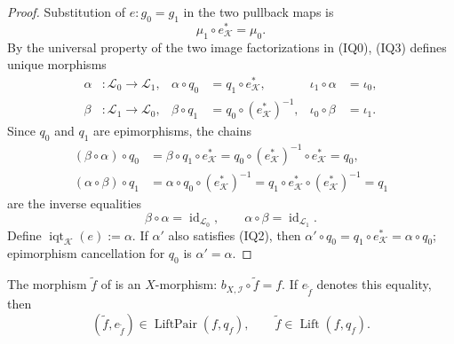 \begin{proof}
  Substitution of $e\colon g_0=g_1$ in the two pullback maps is
  \[
    \mu_1\circ e_{\mathcal K}^*=\mu_0.                        \tag{IQ3}
  \]
  By the universal property of the two image factorizations in (IQ0), (IQ3)
  defines unique morphisms
  \[
  \begin{aligned}
    \alpha&\colon\mathcal L_0\to\mathcal L_1,
      &\alpha\circ q_0&=q_1\circ e_{\mathcal K}^*,
      &\iota_1\circ\alpha&=\iota_0,\\
    \beta&\colon\mathcal L_1\to\mathcal L_0,
      &\beta\circ q_1&=q_0\circ(e_{\mathcal K}^*)^{-1},
      &\iota_0\circ\beta&=\iota_1.
  \end{aligned}                                                  \tag{IQ4}
  \]
  Since $q_0$ and $q_1$ are epimorphisms, the chains
  \[
  \begin{aligned}
    (\beta\circ\alpha)\circ q_0
      &=\beta\circ q_1\circ e_{\mathcal K}^*
       =q_0\circ(e_{\mathcal K}^*)^{-1}\circ e_{\mathcal K}^*=q_0,\\
    (\alpha\circ\beta)\circ q_1
      &=\alpha\circ q_0\circ(e_{\mathcal K}^*)^{-1}
       =q_1\circ e_{\mathcal K}^*\circ(e_{\mathcal K}^*)^{-1}=q_1
  \end{aligned}
  \]
  are the inverse equalities
  \[
    \beta\circ\alpha=\operatorname{id}_{\mathcal L_0},
    \qquad
    \alpha\circ\beta=\operatorname{id}_{\mathcal L_1}.
  \]
  Define $\operatorname{iqt}_{\mathcal K}(e):=\alpha$.  If $\alpha'$ also
  satisfies (IQ2), then
  $\alpha'\circ q_0=q_1\circ e_{\mathcal K}^*=\alpha\circ q_0$; epimorphism
  cancellation for $q_0$ is $\alpha'=\alpha$.
\end{proof}

\begin{lemma}
  \label{lemma:nagata-blowup-universal-exists}

  The morphism $\widetilde f$ of
   is an $X$-morphism:
  $b_{X,\mathcal I}\circ\widetilde f=f$.  If
  $e_{\widetilde f}$ denotes this equality, then
  \[
    (\widetilde f,e_{\widetilde f})
      \in\operatorname{LiftPair}(f,q_f),
    \qquad
    \widetilde f\in\operatorname{Lift}(f,q_f).
  \]
\end{lemma}

